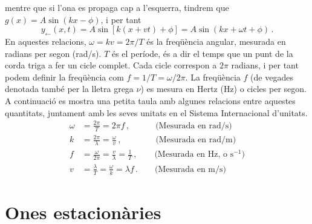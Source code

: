 \documentclass[12pt]{book}
\begin{document}
%
mentre que si l'ona es propaga cap a l'esquerra, tindrem que $g(x) = A \sin (k x - \phi)$, i per tant 
%
\begin{equation}
    y_{\leftarrow}(x, t) = A \sin \left[ k (x + vt) + \phi \right] = A \sin ( k x + \omega t + \phi )\, .
\end{equation}
%
En aquestes relacions, $\omega = k v = 2\pi / T$ és la freqüència angular, mesurada en radians per segon (rad/s). $T$ és el període, és a dir el temps que un punt de la corda triga a fer un cicle complet. Cada cicle correspon a $2\pi$ radians, i per tant podem definir la freqüència com $f = 1 / T = \omega / 2 \pi$. La freqüència $f$ (de vegades denotada també per la lletra grega $\nu$) es mesura en Hertz (Hz) o cicles per segon. A continuació es mostra una petita taula amb algunes relacions entre aquestes quantitats, juntament amb les seves unitats en el Sistema Internacional d'unitats.
%
\begin{equation}
    \boxed{
    \begin{split}
        \omega &= \frac{2\pi}{T} = 2\pi f\, , \quad  \qquad \text{(Mesurada en rad/s)}\\
        k &= \frac{2\pi}{\lambda} = \frac{\omega}{v}\, , \qquad  \qquad \text{(Mesurada en rad/m)}\\
        f &= \frac{\omega}{2\pi} = \frac{v}{\lambda} = \frac{1}{T}\, , \qquad \text{(Mesurada en Hz, o s$^{-1}$)} \\
        v &= \frac{\lambda}{T} = \frac{\omega}{k} = \lambda f \, .  \qquad \text{(Mesurada en m/s)}
    \end{split}
    }
\end{equation}

\section{Ones estacionàries}
\end{document}
